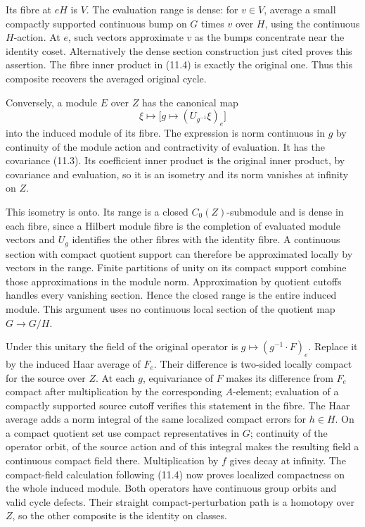 \documentclass[
  11pt,
]{article}
\begin{document}
Its fibre at \(eH\) is \(V\). The evaluation range is dense: for
\(v\in V\), average a small compactly supported continuous bump on \(G\)
times \(v\) over \(H\), using the continuous \(H\)-action. At \(e\),
such vectors approximate \(v\) as the bumps concentrate near the
identity coset. Alternatively the dense section construction just cited
proves this assertion. The fibre inner product in (11.4) is exactly the
original one. Thus this composite recovers the averaged original cycle.

Conversely, a module \(E\) over \(Z\) has the canonical map \[
\xi\longmapsto\bigl[g\longmapsto (U_{g^{-1}}\xi)_e\bigr]
\tag{11.5}
\] into the induced module of its fibre. The expression is norm
continuous in \(g\) by continuity of the module action and contractivity
of evaluation. It has the covariance (11.3). Its coefficient inner
product is the original inner product, by covariance and evaluation, so
it is an isometry and its norm vanishes at infinity on \(Z\).

This isometry is onto. Its range is a closed \(C_0(Z)\)-submodule and is
dense in each fibre, since a Hilbert module fibre is the completion of
evaluated module vectors and \(U_g\) identifies the other fibres with
the identity fibre. A continuous section with compact quotient support
can therefore be approximated locally by vectors in the range. Finite
partitions of unity on its compact support combine those approximations
in the module norm. Approximation by quotient cutoffs handles every
vanishing section. Hence the closed range is the entire induced module.
This argument uses no continuous local section of the quotient map
\(G\to G/H\).

Under this unitary the field of the original operator is
\(g\mapsto(g^{-1}\cdot F)_e\). Replace it by the induced Haar average of
\(F_e\). Their difference is two-sided locally compact for the source
over \(Z\). At each \(g\), equivariance of \(F\) makes its difference
from \(F_e\) compact after multiplication by the corresponding
\(A\)-element; evaluation of a compactly supported source cutoff
verifies this statement in the fibre. The Haar average adds a norm
integral of the same localized compact errors for \(h\in H\). On a
compact quotient set use compact representatives in \(G\); continuity of
the operator orbit, of the source action and of this integral makes the
resulting field a continuous compact field there. Multiplication by
\(f\) gives decay at infinity. The compact-field calculation following
(11.4) now proves localized compactness on the whole induced module.
Both operators have continuous group orbits and valid cycle defects.
Their straight compact-perturbation path is a homotopy over \(Z\), so
the other composite is the identity on classes.
\end{document}
